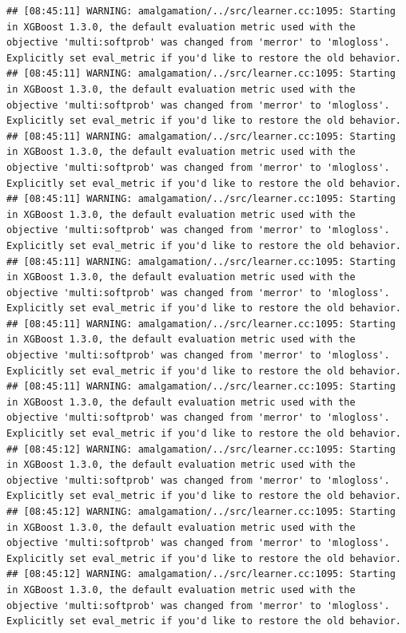 \documentclass[
]{scrbook}
\begin{document}
\begin{verbatim}
## [08:45:11] WARNING: amalgamation/../src/learner.cc:1095: Starting in XGBoost 1.3.0, the default evaluation metric used with the objective 'multi:softprob' was changed from 'merror' to 'mlogloss'. Explicitly set eval_metric if you'd like to restore the old behavior.
## [08:45:11] WARNING: amalgamation/../src/learner.cc:1095: Starting in XGBoost 1.3.0, the default evaluation metric used with the objective 'multi:softprob' was changed from 'merror' to 'mlogloss'. Explicitly set eval_metric if you'd like to restore the old behavior.
## [08:45:11] WARNING: amalgamation/../src/learner.cc:1095: Starting in XGBoost 1.3.0, the default evaluation metric used with the objective 'multi:softprob' was changed from 'merror' to 'mlogloss'. Explicitly set eval_metric if you'd like to restore the old behavior.
## [08:45:11] WARNING: amalgamation/../src/learner.cc:1095: Starting in XGBoost 1.3.0, the default evaluation metric used with the objective 'multi:softprob' was changed from 'merror' to 'mlogloss'. Explicitly set eval_metric if you'd like to restore the old behavior.
## [08:45:11] WARNING: amalgamation/../src/learner.cc:1095: Starting in XGBoost 1.3.0, the default evaluation metric used with the objective 'multi:softprob' was changed from 'merror' to 'mlogloss'. Explicitly set eval_metric if you'd like to restore the old behavior.
## [08:45:11] WARNING: amalgamation/../src/learner.cc:1095: Starting in XGBoost 1.3.0, the default evaluation metric used with the objective 'multi:softprob' was changed from 'merror' to 'mlogloss'. Explicitly set eval_metric if you'd like to restore the old behavior.
## [08:45:11] WARNING: amalgamation/../src/learner.cc:1095: Starting in XGBoost 1.3.0, the default evaluation metric used with the objective 'multi:softprob' was changed from 'merror' to 'mlogloss'. Explicitly set eval_metric if you'd like to restore the old behavior.
## [08:45:12] WARNING: amalgamation/../src/learner.cc:1095: Starting in XGBoost 1.3.0, the default evaluation metric used with the objective 'multi:softprob' was changed from 'merror' to 'mlogloss'. Explicitly set eval_metric if you'd like to restore the old behavior.
## [08:45:12] WARNING: amalgamation/../src/learner.cc:1095: Starting in XGBoost 1.3.0, the default evaluation metric used with the objective 'multi:softprob' was changed from 'merror' to 'mlogloss'. Explicitly set eval_metric if you'd like to restore the old behavior.
## [08:45:12] WARNING: amalgamation/../src/learner.cc:1095: Starting in XGBoost 1.3.0, the default evaluation metric used with the objective 'multi:softprob' was changed from 'merror' to 'mlogloss'. Explicitly set eval_metric if you'd like to restore the old behavior.

\end{verbatim}
\end{document}
